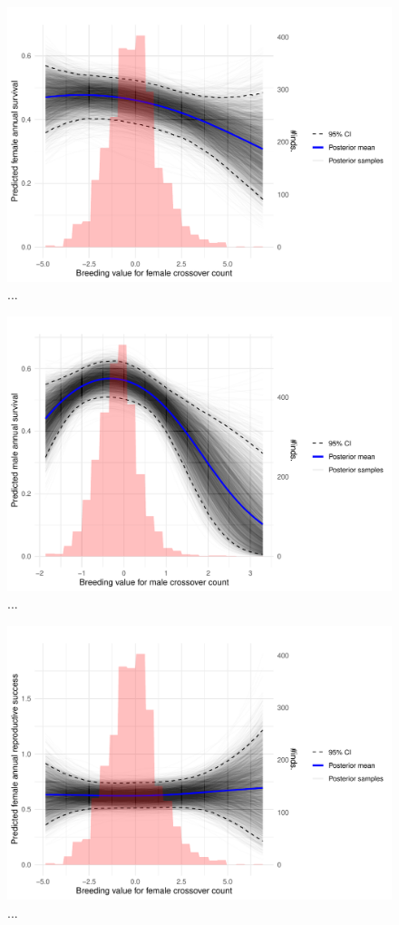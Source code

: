 \documentclass[dvipsnames]{article}
\begin{document}
\begin{figure}
    \centering
    \includegraphics[width=0.91\linewidth]{figs/surv_bv_pred_f.pdf}
    \caption{...}
    \label{fig-surv_bv_f}
\end{figure}

\begin{figure}
    \centering
    \includegraphics[width=0.91\linewidth]{figs/surv_bv_pred_m.pdf}
    \caption{...}
    \label{fig-surv_bv_m}
\end{figure}

\begin{figure}
    \centering
    \includegraphics[width=0.91\linewidth]{figs/ars_bv_pred_f.pdf}
    \caption{...}
    \label{fig-ars_bv_f}
\end{figure}
\end{document}
